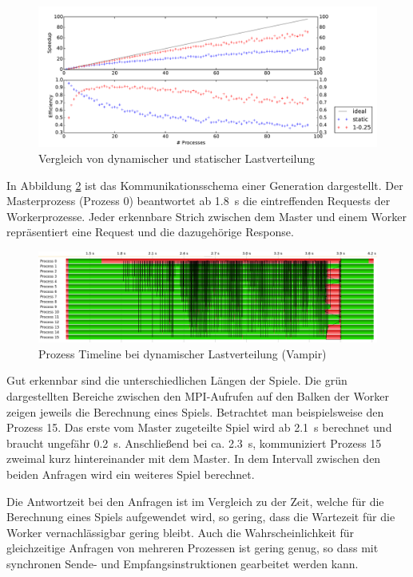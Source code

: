 \begin{figure}
    \centering
    \includegraphics[width=\textwidth]
        {content/img/strong_scaling_time_final.pdf}
    \caption{Vergleich von dynamischer und statischer Lastverteilung}
    \label{fig:speedup_final}
\end{figure}

In Abbildung \ref{fig:vampir_dynamic} ist das Kommunikationsschema einer
Generation dargestellt. Der Masterprozess (Prozess 0) beantwortet ab
\SI{1,8}{\second} die eintreffenden Requests der Workerprozesse. Jeder
erkennbare Strich zwischen dem Master und einem Worker repräsentiert eine
Request und die dazugehörige Response.

\begin{figure}
    \centering
    \includegraphics[width=\textwidth]
        {content/img/vampir_dynamic.png}
        \caption{Prozess Timeline bei dynamischer Lastverteilung (Vampir)}
    \label{fig:vampir_dynamic}
\end{figure}

Gut erkennbar sind die unterschiedlichen Längen der Spiele. Die grün
dargestellten Bereiche zwischen den MPI-Aufrufen auf den Balken der Worker
zeigen jeweils die Berechnung eines Spiels. Betrachtet man beispielsweise den
Prozess 15. Das erste vom Master zugeteilte Spiel wird ab \SI{2,1}{\second}
berechnet und braucht ungefähr \SI{0,2}{\second}. Anschließend bei ca.
\SI{2,3}{\second}, kommuniziert Prozess 15 zweimal kurz hintereinander mit dem
Master. In dem Intervall zwischen den beiden Anfragen wird ein weiteres Spiel
berechnet.

Die Antwortzeit bei den Anfragen ist im Vergleich zu der Zeit, welche für die
Berechnung eines Spiels aufgewendet wird, so gering, dass die Wartezeit für die
Worker vernachlässigbar gering bleibt. Auch die Wahrscheinlichkeit für
gleichzeitige Anfragen von mehreren Prozessen ist gering genug, so dass mit
synchronen Sende- und Empfangsinstruktionen gearbeitet werden kann.

